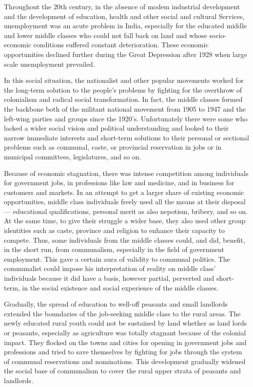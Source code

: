 \begin{multicols}{2}
Throughout the 20th century, in the absence of modem industrial development and the development of education, health and other social and cultural Services, unemployment was an acute problem in India, especially for the educated middle and lower middle classes who could not fall back on land and whose socio-economic conditions suffered constant deterioration. These economic opportunities declined further during the Great Depression after 1928 when large scale unemployment prevailed.

In this social situation, the nationalist and other popular movements worked for the long-term solution to the people's problems by fighting for the overthrow of colonialism and radical social transformation. In fact, the middle classes formed the backbone both of the militant national movement from 1905 to 1947 and the left-wing parties and groups since the 1920's. Unfortunately there were some who lacked a wider social vision and political understanding and looked to their narrow immediate interests and short-term solutions to their personal or sectional problems such as communal, caste, or provincial reservation in jobs or in municipal committees, legislatures, and so on.

Because of economic stagnation, there was intense competition among individuals for government jobs, in professions like law and medicine, and in business for customers and markets. In an attempt to get a larger share of existing economic opportunities, middle class individuals freely used all the means at their disposal --- educational qualifications, personal merit as also nepotism, bribery, and so on. At the same time, to give their struggle a wider base, they also used other group identities such as caste, province and religion to enhance their capacity to compete. Thus, some individuals from the middle classes could, and did, benefit, in the short run, from communalism, especially in the field of government employment. This gave a certain aura of validity to communal politics. The communalist could impose his interpretation of reality on middle class' individuals because it did have a basis, however partial, perverted and short-term, in the social existence and social experience of the middle classes.

Gradually, the spread of education to well-off peasants and small landlords extended the boundaries of the job-seeking middle class to the rural areas. The newly educated rural youth could not be sustained by land whether as land lords or peasants, especially as agriculture was totally stagnant because of the colonial impact. They flocked on the towns and cities for opening in government jobs and professions and tried to save themselves by fighting for jobs through the system of communal reservations and nominations. This development gradually widened the social base of communalism to cover the rural upper strata of peasants and landlords.


\end{multicols}
